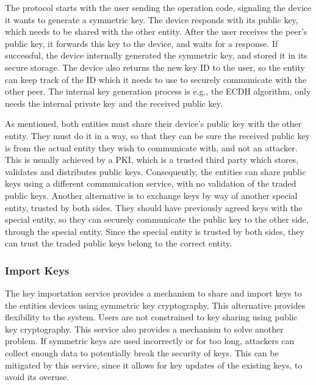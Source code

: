 The protocol starts with the user sending the operation code, signaling the device it wants to generate a symmetric key. The device responds with its public key, which needs to be shared with the other entity. After the user receives the peer's public key, it forwards this key to the device, and waits for a response. If successful, the device internally generated the symmetric key, and stored it in its secure storage. The device also returns the new key ID to the user, so the entity can keep track of the ID which it needs to use to securely communicate with the other peer.
The internal key generation process is e.g., the ECDH algorithm, only needs the internal private key and the received public key.

As mentioned, both entities must share their device's public key with the other entity. They must do it in a way, so that they can be sure the received public key is from the actual entity they wish to communicate with, and not an attacker. This is usually achieved by a PKI, which is a trusted third party which stores, validates and distributes public keys. 
Consequently, the entities can share public keys using a different communication service, with no validation of the traded public keys. Another alternative is to exchange keys by way of another special entity, trusted by both sides. They should have previously agreed keys with the special entity, so they can securely communicate the public key to the other side, through the special entity. Since the special entity is trusted by both sides, they can trust the traded public keys belong to the correct entity.

\subsubsection{Import Keys}\label{chap:arch:services:new-comms:import}

The key importation service provides a mechanism to share and import keys to the entities devices using symmetric key cryptography. This alternative provides flexibility to the system.
Users are not constrained to key sharing using public key cryptography. This service also provides a mechanism to solve another problem. If symmetric keys are used incorrectly or for too long, attackers can collect enough data to potentially break the security of keys. This can be mitigated by this service, since it allows for key updates of the existing keys, to avoid its overuse.

